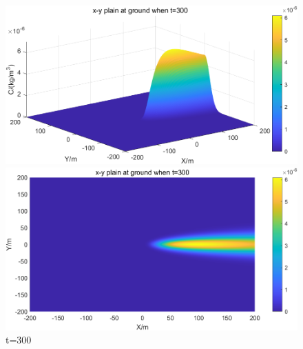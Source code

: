 \documentclass{article}
\begin{document}
	\begin{figure}[htbp]
		\begin{minipage}{0.49\textwidth}
			\includegraphics[width=\textwidth]{pics/default,t=300,3D.png}
		\end{minipage}
		\begin{minipage}{0.49\textwidth}
			\includegraphics[width=\textwidth]{pics/default,t=300,2D.png}
		\end{minipage}
		\caption{t=300}
		\label{fig6}
	\end{figure}
\end{document}
